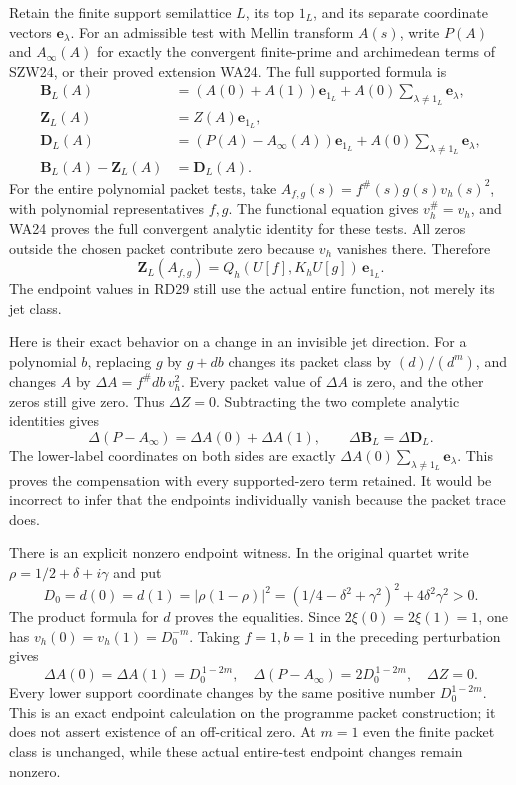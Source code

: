 \documentclass[
  10pt,
  a4paper,
]{article}
\begin{document}
Retain the finite support semilattice \(L\), its top \(1_L\), and its
separate coordinate vectors \(\mathbf e_\lambda\). For an admissible
test with Mellin transform \(A(s)\), write \(P(A)\) and \(A_\infty(A)\)
for exactly the convergent finite-prime and archimedean terms of SZW24,
or their proved extension WA24. The full supported formula is \[
\begin{aligned}
\boldsymbol B_L(A)&=(A(0)+A(1))\mathbf e_{1_L}
+A(0)\sum_{\lambda\ne1_L}\mathbf e_\lambda,\\
\boldsymbol Z_L(A)&=Z(A)\mathbf e_{1_L},\\
\boldsymbol D_L(A)&=(P(A)-A_\infty(A))\mathbf e_{1_L}
+A(0)\sum_{\lambda\ne1_L}\mathbf e_\lambda,\\
\boldsymbol B_L(A)-\boldsymbol Z_L(A)&=\boldsymbol D_L(A).
\end{aligned}
\tag{RD29}
\] For the entire polynomial packet tests, take
\(A_{f,g}(s)=f^\#(s)g(s)v_h(s)^2\), with polynomial representatives
\(f,g\). The functional equation gives \(v_h^\#=v_h\), and WA24 proves
the full convergent analytic identity for these tests. All zeros outside
the chosen packet contribute zero because \(v_h\) vanishes there.
Therefore \[
\boldsymbol Z_L(A_{f,g})=
Q_h(U[f],K_hU[g])\,\mathbf e_{1_L}.
\tag{RD30}
\] The endpoint values in RD29 still use the actual entire function, not
merely its jet class.

Here is their exact behavior on a change in an invisible jet direction.
For a polynomial \(b\), replacing \(g\) by \(g+db\) changes its packet
class by \((d)/(d^m)\), and changes \(A\) by \(\Delta A=f^\#db\,v_h^2\).
Every packet value of \(\Delta A\) is zero, and the other zeros still
give zero. Thus \(\Delta Z=0\). Subtracting the two complete analytic
identities gives \[
\Delta(P-A_\infty)=\Delta A(0)+\Delta A(1),\qquad
\Delta\boldsymbol B_L=\Delta\boldsymbol D_L.
\tag{RD31}
\] The lower-label coordinates on both sides are exactly
\(\Delta A(0)\sum_{\lambda\ne1_L}\mathbf e_\lambda\). This proves the
compensation with every supported-zero term retained. It would be
incorrect to infer that the endpoints individually vanish because the
packet trace does.

There is an explicit nonzero endpoint witness. In the original quartet
write \(\rho=1/2+\delta+i\gamma\) and put \[
D_0=d(0)=d(1)=|\rho(1-\rho)|^2
=(1/4-\delta^2+\gamma^2)^2+4\delta^2\gamma^2>0.
\tag{RD31a}
\] The product formula for \(d\) proves the equalities. Since
\(2\xi(0)=2\xi(1)=1\), one has \(v_h(0)=v_h(1)=D_0^{-m}\). Taking
\(f=1,b=1\) in the preceding perturbation gives \[
\Delta A(0)=\Delta A(1)=D_0^{\,1-2m},\quad
\Delta(P-A_\infty)=2D_0^{\,1-2m},\quad \Delta Z=0.
\tag{RD31b}
\] Every lower support coordinate changes by the same positive number
\(D_0^{1-2m}\). This is an exact endpoint calculation on the programme
packet construction; it does not assert existence of an off-critical
zero. At \(m=1\) even the finite packet class is unchanged, while these
actual entire-test endpoint changes remain nonzero.
\end{document}
